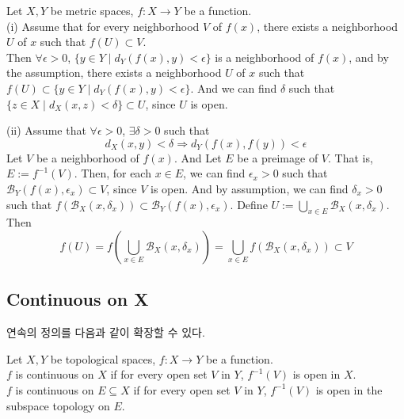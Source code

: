\documentclass[11pt]{article}
\renewcommand{\(}{\left(}
\renewcommand{\)}{\right)}
\renewcommand{\[}{\left[}
\renewcommand{\]}{\right]}
\newcommand{\suchthat}{ \; \big| \; }
\newenvironment{text-box}{}{}
\begin{document}
\begin{text-box}
    Let $X, Y$ be metric spaces, $f: X \to Y$ be a function. \\
    (i) Assume that for every neighborhood $V$ of $f(x)$, there exists a neighborhood $U$ of $x$ 
    such that $f(U) \subset V$. \\
    Then $\forall \epsilon > 0$, $\{ y \in Y \suchthat d_Y(f(x), y) < \epsilon \}$ 
    is a neighborhood of $f(x)$, and by the assumption, there exists a neighborhood $U$ of $x$ 
    such that $f(U) \subset \{ y \in Y \suchthat d_Y(f(x), y) < \epsilon \}$. And we can find 
    $\delta$ such that $\{ z \in X \suchthat d_X(x, z) < \delta \} \subset U$, since $U$ is open.
       
    (ii) Assume that $\forall \epsilon > 0$, $\exists \delta > 0$ such that
    \begin{equation}
        d_X(x, y) < \delta \Rightarrow d_Y(f(x), f(y)) < \epsilon
    \end{equation}
    Let $V$ be a neighborhood of $f(x)$. And Let $E$ be a preimage of $V$. That is, $E := f^{-1} (V)$. 
    Then, for each $x \in E$, we can find $\epsilon_x > 0$ such that $\mathcal B_Y(f(x), \epsilon_x) \subset V$, since $V$ is open. 
    And by assumption, we can find $\delta_x > 0$ such that $f(\mathcal B_X(x, \delta_x)) \subset \mathcal B_Y(f(x), \epsilon_x)$. 
    Define $\displaystyle U := \bigcup_{x \in E} \mathcal B_X(x, \delta_x)$. Then \begin{equation}
        f(U) = f(\bigcup_{x \in E} \mathcal B_X(x, \delta_x)) = \bigcup_{x \in E} f(\mathcal B_X(x, \delta_x)) \subset V
    \end{equation}
\end{text-box}

\subsection{Continuous on X}

연속의 정의를 다음과 같이 확장할 수 있다. \\
\begin{text-box}
    Let $X, Y$ be topological spaces, $f: X \to Y$ be a function. \\
    $f$ is continuous on $X$ if for every open set $V$ in $Y$, $f^{-1}(V)$ is open in $X$. \\
    $f$ is continuous on $E \subseteq X$ if for every open set $V$ in $Y$, $f^{-1}(V)$ is open in the subspace topology on $E$.
\end{text-box}
\end{document}
